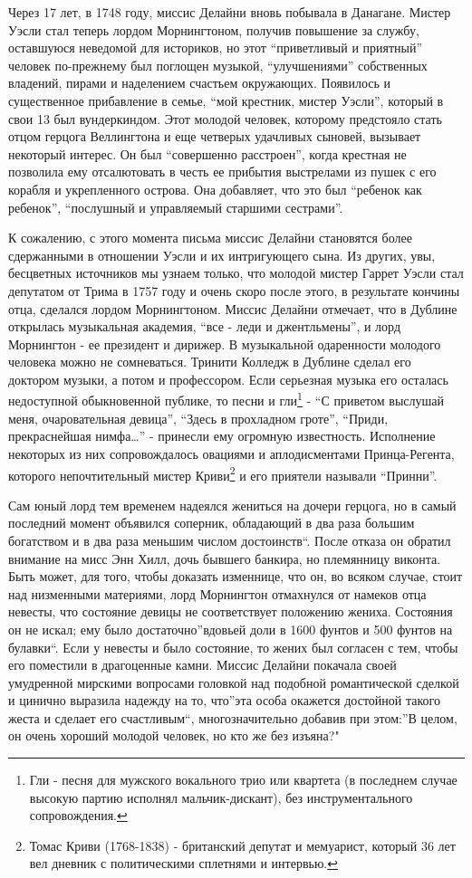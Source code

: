 \documentclass[
  oneside,
  12pt,
  titlepage]{book}
\begin{document}
Через 17 лет, в 1748 году, миссис Делайни вновь побывала в Данагане. Мистер Уэсли стал теперь лордом Морнингтоном, получив повышение за службу, оставшуюся неведомой для историков, но этот ``приветливый и приятный'' человек по-прежнему был поглощен музыкой, ``улучшениями'' собственных владений, пирами и наделением счастьем окружающих. Появилось и существенное прибавление в семье, ``мой крестник, мистер Уэсли'', который в свои 13 был вундеркиндом. Этот молодой человек, которому предстояло стать отцом герцога Веллингтона и еще четверых удачливых сыновей, вызывает некоторый интерес. Он был ``совершенно расстроен'', когда крестная не позволила ему отсалютовать в честь ее прибытия выстрелами из пушек с его корабля и укрепленного острова. Она добавляет, что это был ``ребенок как ребенок'', ``послушный и управляемый старшими сестрами''.

К сожалению, с этого момента письма миссис Делайни становятся более сдержанными в отношении Уэсли и их интригующего сына. Из других, увы, бесцветных источников мы узнаем только, что молодой мистер Гаррет Уэсли стал депутатом от Трима в 1757 году и очень скоро после этого, в результате кончины отца, сделался лордом Морнингтоном. Миссис Делайни отмечает, что в Дублине открылась музыкальная академия, ``все - леди и джентльмены'', и лорд Морнингтон - ее президент и дирижер. В музыкальной одаренности молодого человека можно не сомневаться. Тринити Колледж в Дублине сделал его доктором музыки, а потом и профессором. Если серьезная музыка его осталась недоступной обыкновенной публике, то песни и гли\footnote{Гли - песня для мужского вокального трио или квартета (в последнем случае высокую партию исполнял мальчик-дискант), без инструментального сопровождения.} - ``С приветом выслушай меня, очаровательная девица'', ``Здесь в прохладном гроте'', ``Приди, прекраснейшая нимфа\ldots{}'' - принесли ему огромную известность. Исполнение некоторых из них сопровождалось овациями и аплодисментами Принца-Регента, которого непочтительный мистер Криви\footnote{Томас Криви (1768-1838) - британский депутат и мемуарист, который 36 лет вел дневник с политическими сплетнями и интервью.} и его приятели называли ``Принни''.

Сам юный лорд тем временем надеялся жениться на дочери герцога, но в самый последний момент объявился соперник, обладающий в два раза большим богатством и в два раза меньшим числом достоинств``. После отказа он обратил внимание на мисс Энн Хилл, дочь бывшего банкира, но племянницу виконта. Быть может, для того, чтобы доказать изменнице, что он, во всяком случае, стоит над низменными материями, лорд Морнингтон отмахнулся от намеков отца невесты, что состояние девицы не соответствует положению жениха. Состояния он не искал; ему было достаточно''вдовьей доли в 1600 фунтов и 500 фунтов на булавки``. Если у невесты и было состояние, то жених был согласен с тем, чтобы его поместили в драгоценные камни. Миссис Делайни покачала своей умудренной мирскими вопросами головкой над подобной романтической сделкой и цинично выразила надежду на то, что''эта особа окажется достойной такого жеста и сделает его счастливым``, многозначительно добавив при этом:''В целом, он очень хороший молодой человек, но кто же без изъяна?"
\end{document}
